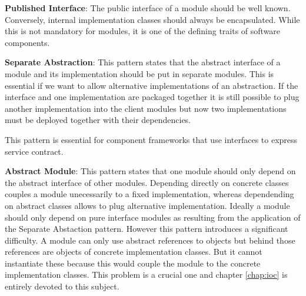 \textbf{Published Interface}:
The public interface of a module should be well known. Conversely, internal implementation classes
should always be encapsulated. While this is not mandatory for modules, it is one of the defining
traits of software components.

\textbf{Separate Abstraction}:
This pattern states that the abstract interface of a module and its implementation should be put in separate modules.
This is essential if we want to allow alternative implementations of an abstraction. If the interface and one implementation
are packaged together it is still possible to plug another implementation into the client modules but now two implementations
must be deployed together with their dependencies.

This pattern is essential for component frameworks that use interfaces to express service contract.

\textbf{Abstract Module}:
This pattern states that one module should only depend on the abstract interface of other modules. Depending directly on
concrete classes couples a module unecessarily to a fixed implementation, whereas dependending on abstract classes allows
to plug alternative implementation. Ideally a module should only depend on pure interface modules as resulting from the
application of the Separate Abstaction pattern. However this pattern introduces a significant difficulty. A module
can only use abstract references to objects but behind those references are objects of concrete implementation classes.
But it cannot instantiate these because this would couple the module to the concrete implementation classes. This problem
is a crucial one and chapter \ref{chap:ioc} is entirely devoted to this subject.
